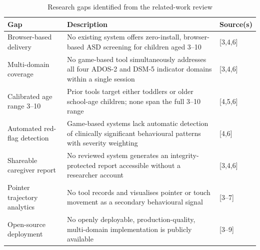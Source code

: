 \documentclass[12pt,a4paper,oneside]{report}
\begin{document}
\begin{table}[t]
  \caption{Research gaps identified from the related-work review}
  \label{tab:gaps}
  \begin{tabularx}{\linewidth}{p{4.0cm}Xp{2.0cm}}
    \toprule
    \textbf{Gap} & \textbf{Description} & \textbf{Source(s)} \\
    \midrule
    Browser-based delivery
      & No existing system offers zero-install, browser-based ASD screening for children aged 3--10
      & [3,4,6] \\
    Multi-domain coverage
      & No game-based tool simultaneously addresses all four ADOS-2 and DSM-5 indicator domains within a single session
      & [3,4,6] \\
    Calibrated age range 3--10
      & Prior tools target either toddlers or older school-age children; none span the full 3--10 range
      & [4,5,6] \\
    Automated red-flag detection
      & Game-based systems lack automatic detection of clinically significant behavioural patterns with severity weighting
      & [4,6] \\
    Shareable caregiver report
      & No reviewed system generates an integrity-protected report accessible without a researcher account
      & [3,4,6] \\
    Pointer trajectory analytics
      & No tool records and visualises pointer or touch movement as a secondary behavioural signal
      & [3--7] \\
    Open-source deployment
      & No openly deployable, production-quality, multi-domain implementation is publicly available
      & [3--9] \\
    \bottomrule
  \end{tabularx}
\end{table}
\end{document}
